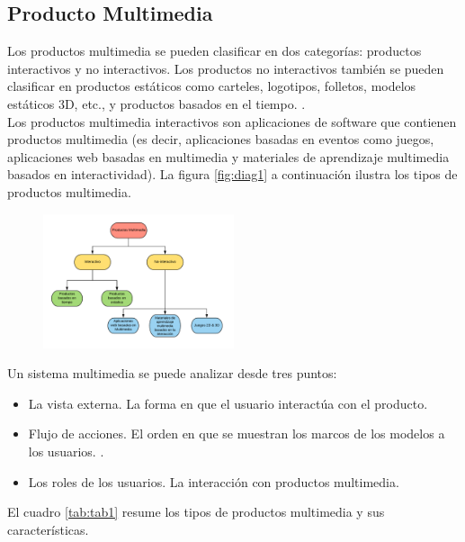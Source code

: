 \subsection{Producto Multimedia}
Los productos multimedia se pueden clasificar en dos categorías: productos interactivos y no interactivos. Los productos no interactivos también se pueden clasificar en productos estáticos como carteles, logotipos, folletos, modelos estáticos 3D, etc., y productos basados en el tiempo. \cite{engels2002object,sauer2001uml}.\\ 
\newline
Los productos multimedia interactivos son aplicaciones de software que contienen productos multimedia\cite{miranda2017diseno} (es decir, aplicaciones basadas en eventos como juegos, aplicaciones web basadas en multimedia y materiales de aprendizaje multimedia basados en interactividad).  La figura \ref{fig:diag1} a continuación ilustra los tipos de productos multimedia.\\
\begin{figure}[H]
	\begin{center}
 		\includegraphics[width = 0.5\textwidth]{source/images/image52.png}
	\end{center} 
\end{figure}

Un sistema multimedia se puede analizar desde tres puntos:
\begin{itemize}
\item La vista externa. La forma en que el usuario interactúa con el producto.
\item Flujo de acciones. El orden en que se muestran los marcos de los modelos a los usuarios. \cite{aleem2016game,cartwright1996pre}.
\item  Los roles de los usuarios. La interacción con productos multimedia.
\end{itemize} 
El cuadro \ref{tab:tab1} resume los tipos de productos multimedia y sus características.

